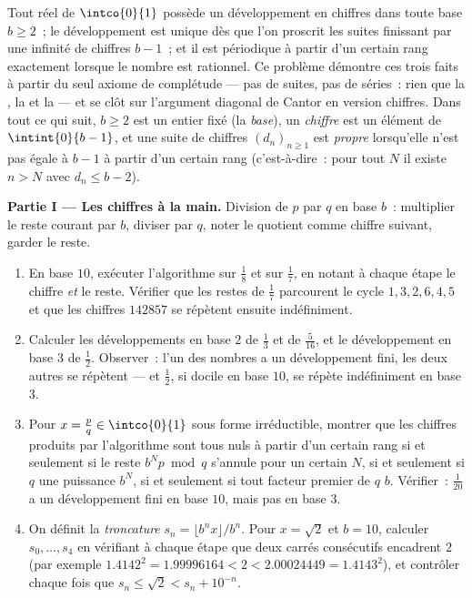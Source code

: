 \begin{problem}
\label{pb:b1:reals:1}
Tout réel de $\intco{0}{1}$ possède un développement en chiffres dans
toute base $b \geq 2$~; le développement est unique dès que l'on
proscrit les suites finissant par une infinité de chiffres $b - 1$~;
et il est périodique à partir d'un certain rang exactement lorsque le
nombre est rationnel. Ce problème démontre ces trois faits à partir du
seul axiome de complétude --- pas de suites, pas de séries~: rien que
la , la  et la  --- et se clôt sur l'argument diagonal de Cantor en version
chiffres. Dans tout ce qui suit, $b \geq 2$ est un entier fixé (la
\emph{base}), un \emph{chiffre} est un élément de $\intint{0}{b-1}$,
et une suite de chiffres $(d_n)_{n \geq 1}$ est \emph{propre}
lorsqu'elle n'est pas égale à $b - 1$ à partir d'un certain rang
(c'est-à-dire~: pour tout $N$ il existe $n > N$ avec $d_n \leq b -
2$).

\medskip
\noindent\textbf{Partie I --- Les chiffres à la main.} Division de $p$
par $q$ en base $b$~: multiplier le reste courant par $b$, diviser par
$q$, noter le quotient comme chiffre suivant, garder le reste.
\begin{enumerate}
  \item En base $10$, exécuter l'algorithme sur $\frac 18$ et sur
        $\frac 17$, en notant à chaque étape le chiffre \emph{et}
        le reste. Vérifier que les restes de $\frac 17$ parcourent
        le cycle $1, 3, 2, 6, 4, 5$ et que les chiffres $142857$
        se répètent ensuite indéfiniment.
  \item Calculer les développements en base $2$ de $\frac 13$ et de
        $\frac{5}{16}$, et le développement en base $3$ de $\frac
        12$. Observer~: l'un des nombres a un développement fini,
        les deux autres se répètent --- et $\frac 12$, si docile en
        base $10$, se répète indéfiniment en base $3$.
  \item Pour $x = \frac pq \in \intco{0}{1}$ sous forme
        irréductible, montrer que les chiffres produits par
        l'algorithme sont tous nuls à partir d'un certain rang si
        et seulement si le reste $b^N p \bmod q$ s'annule pour un
        certain $N$, si et seulement si $q$  une puissance
        $b^N$, si et seulement si tout facteur premier de $q$
         $b$. Vérifier~: $\frac{1}{20}$ a un développement
        fini en base $10$, mais pas en base $3$.
  \item On définit la \emph{troncature} $s_n = \lfloor b^n x \rfloor
        / b^n$. Pour $x = \sqrt 2$ et $b = 10$, calculer $s_0,
        \dots, s_4$ en vérifiant à chaque étape que deux carrés
        consécutifs encadrent $2$ (par exemple $1.4142^2
        = 1.99996164 < 2 < 2.00024449 = 1.4143^2$), et contrôler
        chaque fois que $s_n \leq \sqrt 2 < s_n + 10^{-n}$.
\end{enumerate}


\end{problem}
